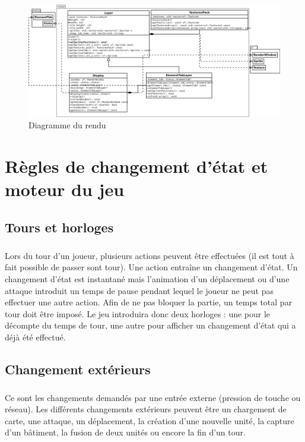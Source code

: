 \documentclass[12pt]{report}
\begin{document}
    
    \newpage
\thispagestyle{empty}
\begin{landscape}
\begin{figure}[h]
\begin{center}
    \includegraphics[scale=0.48]{render.png}
    \end{center}
    \caption{Diagramme du rendu}
\end{figure}
\end{landscape}
    
\newpage

\chapter{Règles de changement d'état et moteur du jeu}
\section{Tours et horloges}
\paragraph{}Lors du tour d'un joueur, plusieurs actions peuvent être effectuées (il est tout à fait possible de passer sont tour). Une action entraîne un changement d'état. Un changement d'état est instantané mais l'animation d'un déplacement ou d'une attaque introduit un temps de pause pendant lequel le joueur ne peut pas effectuer une autre action. Afin de ne pas bloquer la partie, un temps total par tour doit être imposé. Le jeu introduira donc deux horloges : une pour le décompte du temps de tour, une autre pour afficher un changement d'état qui a déjà été effectué.

\section{Changement extérieurs}
\paragraph{}Ce sont les changements demandés par une entrée externe (pression de touche ou réseau).
Les différents changements extérieurs peuvent être un chargement de carte, une attaque, un déplacement, la création d'une nouvelle unité, la capture d'un bâtiment, la fusion de deux unités ou encore la fin d'un tour.
\end{document}
